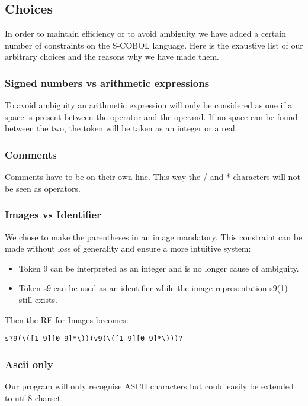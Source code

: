 \subsection{Choices}

In order to maintain efficiency or to avoid ambiguity we have added a certain number of constraints on the S-COBOL language. Here is the exaustive list of our arbitrary choices and the reasons why we have made them.

\subsubsection{Signed numbers vs arithmetic expressions}

To avoid ambiguity an arithmetic expression will only be considered as one if a space is present between the operator and the operand. If no space can be found between the two, the token will be taken as an integer or a real.

\subsubsection{Comments}

Comments have to be on their own line. This way the / and * characters will not be seen as operators.

\subsubsection{Images vs Identifier}

We chose to make the parentheses in an image mandatory. This constraint can be made without loss of generality and ensure a more intuitive system:

\begin{itemize}
	\item Token 9 can be interpreted as an integer and is no longer cause of ambiguity.
	\item Token s9 can be used as an identifier while the image representation s9(1) still exists.  
	
\end{itemize}

Then the RE for Images becomes:

\begin{verbatim}
s?9(\([1-9][0-9]*\))(v9(\([1-9][0-9]*\)))?
\end{verbatim}

\subsubsection{Ascii only}

Our program will only recognise ASCII characters but could easily be extended to utf-8 charset.





